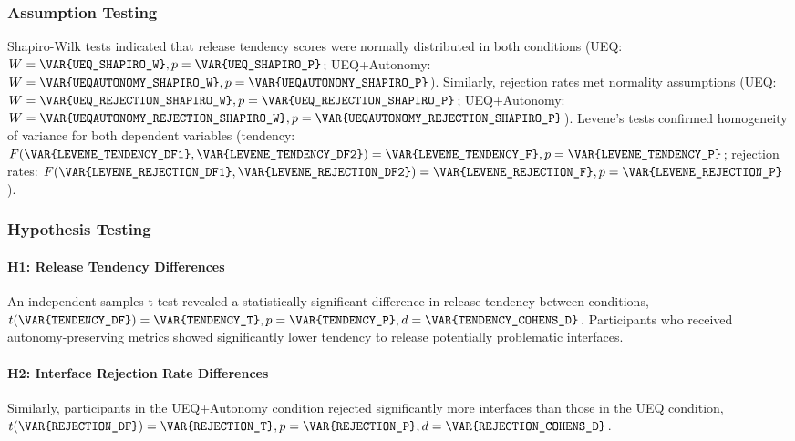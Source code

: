 \subsubsection{Assumption Testing}
Shapiro-Wilk tests indicated that release tendency scores were normally distributed in both conditions (UEQ: $W = \texttt{\VAR{UEQ\_SHAPIRO\_W}}, p = \texttt{\VAR{UEQ\_SHAPIRO\_P}}$; UEQ+Autonomy: $W = \texttt{\VAR{UEQAUTONOMY\_SHAPIRO\_W}}, p = \texttt{\VAR{UEQAUTONOMY\_SHAPIRO\_P}}$). Similarly, rejection rates met normality assumptions (UEQ: $W = \texttt{\VAR{UEQ\_REJECTION\_SHAPIRO\_W}}, p = \texttt{\VAR{UEQ\_REJECTION\_SHAPIRO\_P}}$; UEQ+Autonomy: $W = \texttt{\VAR{UEQAUTONOMY\_REJECTION\_SHAPIRO\_W}}, p = \texttt{\VAR{UEQAUTONOMY\_REJECTION\_SHAPIRO\_P}}$). Levene's tests confirmed homogeneity of variance for both dependent variables (tendency: $F(\texttt{\VAR{LEVENE\_TENDENCY\_DF1}}, \texttt{\VAR{LEVENE\_TENDENCY\_DF2}}) = \texttt{\VAR{LEVENE\_TENDENCY\_F}}, p = \texttt{\VAR{LEVENE\_TENDENCY\_P}}$; rejection rates: $F(\texttt{\VAR{LEVENE\_REJECTION\_DF1}}, \texttt{\VAR{LEVENE\_REJECTION\_DF2}}) = \texttt{\VAR{LEVENE\_REJECTION\_F}}, p = \texttt{\VAR{LEVENE\_REJECTION\_P}}$).

\subsubsection{Hypothesis Testing}

\paragraph{H1: Release Tendency Differences}
An independent samples t-test revealed a statistically significant difference in release tendency between conditions, $t(\texttt{\VAR{TENDENCY\_DF}}) = \texttt{\VAR{TENDENCY\_T}}, p = \texttt{\VAR{TENDENCY\_P}}, d = \texttt{\VAR{TENDENCY\_COHENS\_D}}$. Participants who received autonomy-preserving metrics showed significantly lower tendency to release potentially problematic interfaces.

\paragraph{H2: Interface Rejection Rate Differences}  
Similarly, participants in the UEQ+Autonomy condition rejected significantly more interfaces than those in the UEQ condition, $t(\texttt{\VAR{REJECTION\_DF}}) = \texttt{\VAR{REJECTION\_T}}, p = \texttt{\VAR{REJECTION\_P}}, d = \texttt{\VAR{REJECTION\_COHENS\_D}}$.

